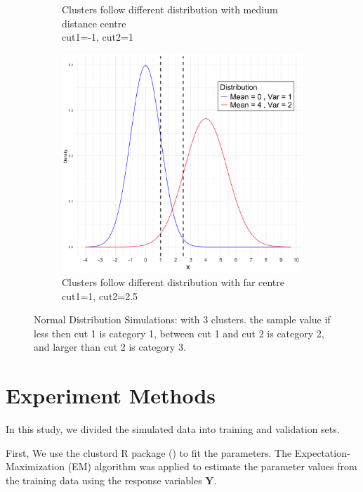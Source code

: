 \documentclass{article}
\begin{document}
\begin{figure}[htbp!]
\begin{subfigure}{0.32\textwidth}
    \caption{Clusters follow different distribution with medium distance centre\\ cut1=-1, cut2=1}
\end{subfigure}
  \hfill
  \begin{subfigure}{0.32\textwidth}  %
      \centering
      \includegraphics[width=\textwidth]{images/dist_simu/norm_dist_far.png} %
      \caption{Clusters follow different distribution with far centre\\ cut1=1, cut2=2.5}
  \end{subfigure}
  
  \caption{Normal Distribution Simulations: with 3 clusters. the sample value if less then cut 1 is category 1, between cut 1 and cut 2 is category 2, and larger than cut 2 is category 3.}
  \label{fig:dist_sim}
\end{figure}


\section{Experiment Methods}

In this study, we divided the simulated data into training and validation sets.

First, We use the clustord R package (\cite{clustord2024}) to fit the parameters. The Expectation-Maximization (EM) algorithm was applied to estimate the parameter values from the training data using the response variables $\bm{Y}$.
\end{document}
